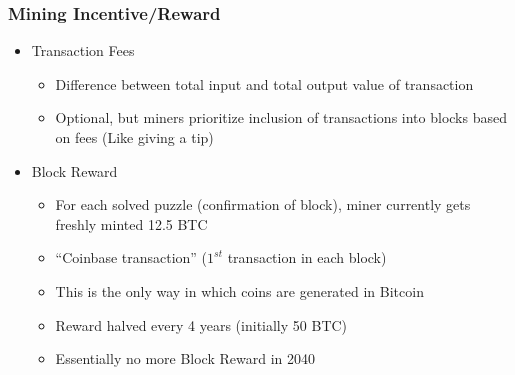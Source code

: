 \subsubsection{Mining Incentive/Reward}
\begin{itemize}
	\item Transaction Fees
	\begin{itemize}
		\item Difference between total input and total output value of transaction
		\item Optional, but miners prioritize inclusion of transactions into blocks based on fees (Like giving a tip)
	\end{itemize}
	\item Block Reward
	\begin{itemize}
		\item For each solved puzzle (confirmation of block), miner currently gets freshly minted 12.5 BTC
		\item ``Coinbase transaction'' ($1^{st}$ transaction in each block)
		\item This is the only way in which coins are generated in Bitcoin
		\item Reward halved every 4 years (initially 50 BTC)
		\item Essentially no more Block Reward in 2040
	\end{itemize}
\end{itemize}

